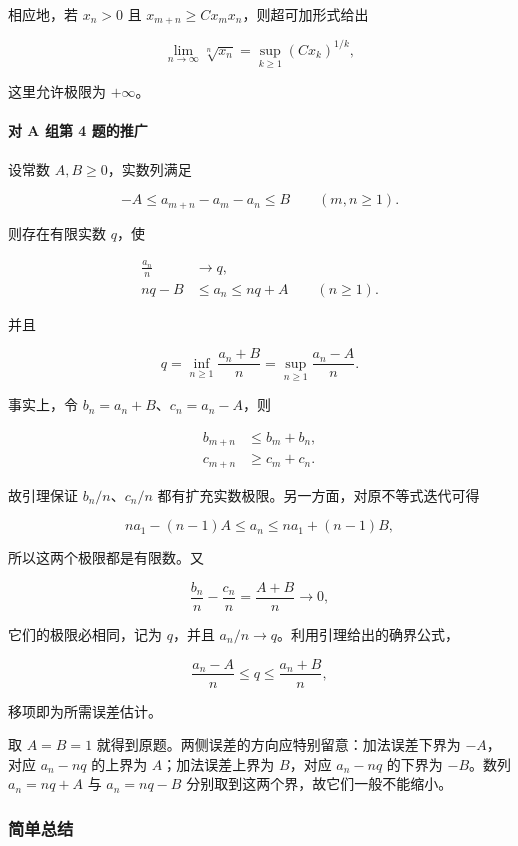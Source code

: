 \documentclass[11pt,a4paper]{article}
\begin{document}
相应地，若 \(x_n>0\) 且 \(x_{m+n}\ge Cx_mx_n\)，则超可加形式给出

\[
\lim_{n\to\infty}\sqrt[n]{x_n}
=\sup_{k\ge1}(Cx_k)^{1/k},
\]

这里允许极限为 \(+\infty\)。

\paragraph{对 A 组第 4
题的推广}\label{ux5bf9-a-ux7ec4ux7b2c-4-ux9898ux7684ux63a8ux5e7f}

设常数 \(A,B\ge0\)，实数列满足

\[
-A\le a_{m+n}-a_m-a_n\le B
\qquad(m,n\ge1).
\]

则存在有限实数 \(q\)，使

\[
\boxed{
\begin{aligned}
\frac{a_n}{n}&\longrightarrow q,\\
nq-B&\le a_n\le nq+A\qquad(n\ge1).
\end{aligned}}
\]

并且

\[
q=\inf_{n\ge1}\frac{a_n+B}{n}
=\sup_{n\ge1}\frac{a_n-A}{n}.
\]

事实上，令 \(b_n=a_n+B\)、\(c_n=a_n-A\)，则

\[
\begin{aligned}
b_{m+n}&\le b_m+b_n,\\
c_{m+n}&\ge c_m+c_n.
\end{aligned}
\]

故引理保证 \(b_n/n\)、\(c_n/n\)
都有扩充实数极限。另一方面，对原不等式迭代可得

\[
na_1-(n-1)A\le a_n\le na_1+(n-1)B,
\]

所以这两个极限都是有限数。又

\[
\frac{b_n}{n}-\frac{c_n}{n}=\frac{A+B}{n}\to0,
\]

它们的极限必相同，记为 \(q\)，并且
\(a_n/n\to q\)。利用引理给出的确界公式，

\[
\frac{a_n-A}{n}\le q\le\frac{a_n+B}{n},
\]

移项即为所需误差估计。

取 \(A=B=1\) 就得到原题。两侧误差的方向应特别留意：加法误差下界为
\(-A\)，对应 \(a_n-nq\) 的上界为 \(A\)；加法误差上界为 \(B\)，对应
\(a_n-nq\) 的下界为 \(-B\)。数列 \(a_n=nq+A\) 与 \(a_n=nq-B\)
分别取到这两个界，故它们一般不能缩小。

\subsubsection{简单总结}\label{ux7b80ux5355ux603bux7ed3-22}
\end{document}
